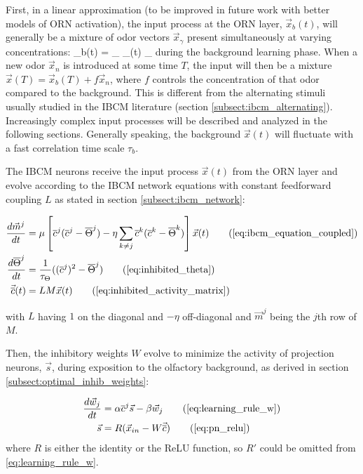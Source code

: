 First, in a linear approximation (to be improved in future work with better models of ORN activation), the input process at the ORN layer, $\vec{x}_b(t)$, will generally be a mixture of odor vectors $\vec{x}_{\gamma}$ present simultaneously at varying concentrations:
\beq
	_b(t) = \sum_{\gamma} \nu_{\gamma}(t) _{\gamma}
	\label{eq:background_mixture}
\eeq
during the background learning phase. When a new odor $\vec{x}_n$ is introduced at some time $T$, the input will then be a mixture $\vec{x}(T) = \vec{x}_b(T) + f \vec{x}_n$, where $f$ controls the concentration of that odor compared to the background. This is different from the alternating stimuli usually studied in the IBCM literature (section \ref{subsect:ibcm_alternating}). Increasingly complex input processes will be described and analyzed in the following sections. Generally speaking, the background $\vec{x}(t)$ will fluctuate with a fast correlation time scale $\tau_b$. 

The IBCM neurons receive the input process $\vec{x}(t)$ from the ORN layer and evolve according to the IBCM network equations with constant feedforward coupling $L$ as stated in section \ref{subsect:ibcm_network}:

\begin{align*}
	\frac{d \vec{m}^j}{dt} &= \mu \left[ \ovl{c}^j (\ovl{c}^j - \ovl{\Theta}^j) - \eta \sum_{k \neq j} \ovl{c}^k (\ovl{c}^k - \ovl{\Theta}^k )  \right] \vec{x}(t) 			\tag{\ref{eq:ibcm_equation_coupled}} \\
	\frac{d \ovl{\Theta}^j}{dt} &= \frac{1}{\tau_{\Theta}} ((\ovl{c}^j)^2 - \ovl{\Theta}^j)  \tag{\ref{eq:inhibited_theta}}  \\
	\vec{\ovl{c}}(t) &= L M \vec{x}(t)		\tag{\ref{eq:inhibited_activity_matrix}}
\end{align*}

with $L$ having $1$ on the diagonal and $-\eta$ off-diagonal and $\vec{m}^j$ being the $j$th row of $M$. 

Then, the inhibitory weights $W$ evolve to minimize the activity of projection neurons, $\vec{s}$, during exposition to the olfactory background, as derived in section \ref{subsect:optimal_inhib_weights}:

\begin{align*}
	\frac{d \vec{w}_j}{dt} &= \alpha \ovl{c}^j \vec{s} - \beta \vec{w}_j  	\tag{\ref{eq:learning_rule_w}} \\
	\vec{s} &= R(\vec{x}_{in} -  W\vec{\ovl{c}})   \tag{\ref{eq:pn_relu}}
\end{align*}
where $R$ is either the identity or the ReLU function, so $R'$ could be omitted from \eqref{eq:learning_rule_w}. 

